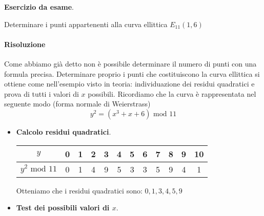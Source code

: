 \begin{framed}
	\noindent \textbf{Esercizio da esame}. 
	
	\noindent Determinare i punti appartenenti alla curva ellittica $E_{11}(1, 6)$
	
	\paragraph{Risoluzione} Come abbiamo già detto non è possibile determinare il numero di punti con una formula precisa. Determinare proprio i punti che costituiscono la curva ellittica si ottiene come nell'esempio visto in teoria: individuazione dei residui quadratici e prova di tutti i valori di $x$ possibili. Ricordiamo che la curva è rappresentata nel seguente modo (forma normale di Weierstrass)
	$$y^2=(x^3+x+6)\text{ mod }11$$
	\begin{itemize}
		\item \textbf{Calcolo residui quadratici}.
		
		\begin{center}
			\begin{tabular}{c|c c c c c c c c c c c }
				$y$ & 0& 1 & 2 & 3 & 4 & 5 & 6 & 7 & 8 & 9 & 10   \\
				\hline
				$y^2 \text{ mod } 11$ & 0&1&4&9&5&3&3&5&9&4&1\\
			\end{tabular}
		\end{center}
		
		Otteniamo che i residui quadratici sono: $0,1,3,4,5,9$
		
		\item \textbf{Test dei possibili valori di $x$}. 
		

\end{itemize}
\end{framed}

